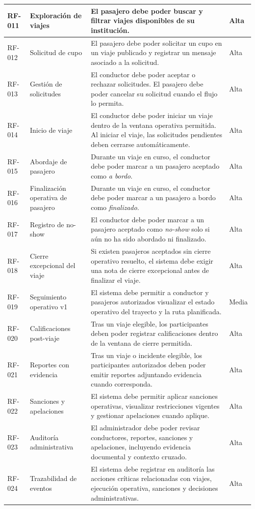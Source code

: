 \documentclass[12pt]{article}
\begin{document}
\begin{longtable}{|P{1.8cm}|P{3.8cm}|P{7.2cm}|P{2.2cm}|}
\hline
RF-011 & Exploraci\'on de viajes & El pasajero debe poder buscar y filtrar viajes disponibles de su instituci\'on. & Alta \\
\hline
RF-012 & Solicitud de cupo & El pasajero debe poder solicitar un cupo en un viaje publicado y registrar un mensaje asociado a la solicitud. & Alta \\
\hline
RF-013 & Gesti\'on de solicitudes & El conductor debe poder aceptar o rechazar solicitudes. El pasajero debe poder cancelar su solicitud cuando el flujo lo permita. & Alta \\
\hline
RF-014 & Inicio de viaje & El conductor debe poder iniciar un viaje dentro de la ventana operativa permitida. Al iniciar el viaje, las solicitudes pendientes deben cerrarse autom\'aticamente. & Alta \\
\hline
RF-015 & Abordaje de pasajero & Durante un viaje en curso, el conductor debe poder marcar a un pasajero aceptado como \textit{a bordo}. & Alta \\
\hline
RF-016 & Finalizaci\'on operativa de pasajero & Durante un viaje en curso, el conductor debe poder marcar a un pasajero a bordo como \textit{finalizado}. & Alta \\
\hline
RF-017 & Registro de no-show & El conductor debe poder marcar a un pasajero aceptado como \textit{no-show} solo si a\'un no ha sido abordado ni finalizado. & Alta \\
\hline
RF-018 & Cierre excepcional del viaje & Si existen pasajeros aceptados sin cierre operativo resuelto, el sistema debe exigir una nota de cierre excepcional antes de finalizar el viaje. & Alta \\
\hline
RF-019 & Seguimiento operativo v1 & El sistema debe permitir a conductor y pasajeros autorizados visualizar el estado operativo del trayecto y la ruta planificada. & Media \\
\hline
RF-020 & Calificaciones post-viaje & Tras un viaje elegible, los participantes deben poder registrar calificaciones dentro de la ventana de cierre permitida. & Alta \\
\hline
RF-021 & Reportes con evidencia & Tras un viaje o incidente elegible, los participantes autorizados deben poder emitir reportes adjuntando evidencia cuando corresponda. & Alta \\
\hline
RF-022 & Sanciones y apelaciones & El sistema debe permitir aplicar sanciones operativas, visualizar restricciones vigentes y gestionar apelaciones cuando aplique. & Alta \\
\hline
RF-023 & Auditor\'ia administrativa & El administrador debe poder revisar conductores, reportes, sanciones y apelaciones, incluyendo evidencia documental y contexto cruzado. & Alta \\
\hline
RF-024 & Trazabilidad de eventos & El sistema debe registrar en auditor\'ia las acciones cr\'iticas relacionadas con viajes, ejecuci\'on operativa, sanciones y decisiones administrativas. & Alta \\
\hline
\end{longtable}
\end{document}
